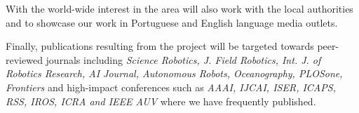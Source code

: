 With the world-wide interest in the area \proj will also work with the
local authorities and \inst to showcase our work in Portuguese and
English language media outlets.

Finally, publications resulting from the project will be targeted
towards peer-reviewed journals including \emph{Science Robotics,
  J. Field Robotics, Int. J. of Robotics Research, AI Journal,
  Autonomous Robots, Oceanography, PLOSone, Frontiers} and high-impact
conferences such as \emph{AAAI, IJCAI, ISER, ICAPS, RSS, IROS, ICRA
  and IEEE AUV} where we have frequently published.

